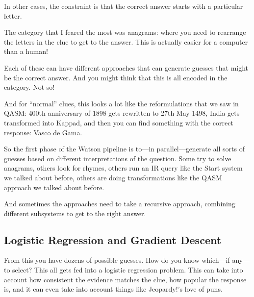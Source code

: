 In other cases, the constraint is that the correct answer starts with a particular letter.  

The category that I feared the most was anagrams: where you need to rearrange the letters in the clue to get to the answer.  This is actually easier for a computer than a human!

Each of these can have different approaches that can generate guesses that
might be the correct answer.  And you might think that this is all encoded in
the category.  Not so!

And for “normal” clues, this looks a lot like the reformulations that we saw in QASM: 400th anniversary of 1898 gets rewritten to 27th May 1498, India gets transformed into Kappad, and then you can find something with the correct response: Vasco de Gama.

So the first phase of the Watson pipeline is to---in parallel---generate all
sorts of guesses based on different interpretations of the question.  Some try
to solve anagrams, others look for rhymes, others run an IR query like the
Start system we talked about before, others are doing transformations like the
QASM approach we talked about before.

And sometimes the approaches need to take a recursive approach, combining
different subsystems to get to the right answer.

\subsection{Logistic Regression and Gradient Descent}
\label{sec:logistic-regression}

From this you have dozens of possible guesses.  How do you know which---if
any—to select?  This all gets fed into a logistic regression problem.  This
can take into account how consistent the evidence matches the clue, how
popular the response is, and it can even take into account things like
Jeopardy!’s love of puns.

